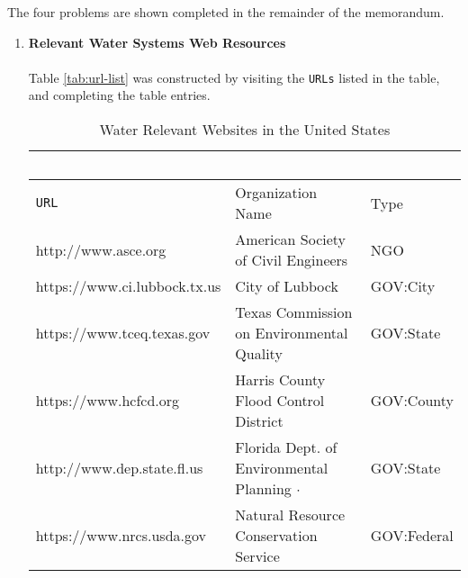 \documentclass[12pt]{article}
\begin{document}
The four problems are shown completed in the remainder of the memorandum.  
\newpage
\begin{enumerate}
\item{{\textbf{Relevant Water Systems Web Resources}}}~\\~\\
Table \ref{tab:url-list} was constructed by visiting the \texttt{URLs} listed in the table, and completing the table entries.  
\begin{table}[htbp]
   \centering
   \caption{Water Relevant Websites in the United States}
   \begin{tabular}{p{2.2in}p{3.5in}p{0.9in}} %
   ~ & ~ & ~ \\
\hline \hline
\texttt{URL} & Organization Name & Type \\
\hline
http://www.asce.org & American Society of Civil Engineers & NGO \\
https://www.ci.lubbock.tx.us & City of Lubbock & GOV:City\\
https://www.tceq.texas.gov & Texas Commission on Environmental Quality & GOV:State\\
https://www.hcfcd.org & Harris County Flood Control District & GOV:County \\
http://www.dep.state.fl.us & Florida Dept. of Environmental Planning $\cdot$ & GOV:State  \\
https://www.nrcs.usda.gov & Natural Resource Conservation Service & GOV:Federal \\

\end{tabular}
\end{table}
\end{enumerate}
\end{document}
